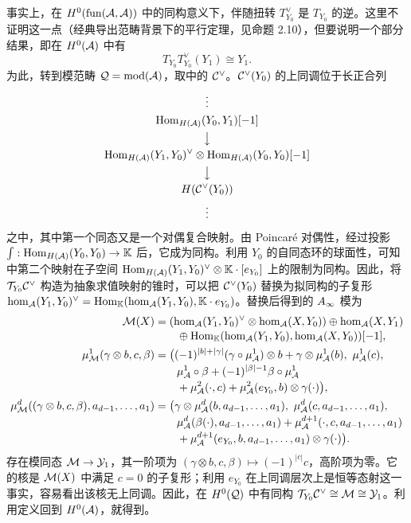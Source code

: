 \begin{note}\label{st:5.12}
事实上，在 $H^0(\operatorname{fun}(\mathcal A,\mathcal A))$ 中的同构意义下，伴随扭转 $T_{Y_0}^{\vee}$ 是 $T_{Y_0}$ 的逆。这里不证明这一点（经典导出范畴背景下的平行定理，见命题 2.10），但要说明一个部分结果，即在 $H^0(\mathcal A)$ 中有
\begin{equation}\label{eq:5.21}
T_{Y_0}T_{Y_0}^{\vee}(Y_1)\cong Y_1.
\end{equation}
为此，转到模范畴 $\mathcal Q=\operatorname{mod}(\mathcal A)$，取中的 $\mathcal C^{\vee}$。$\mathcal C^{\vee}(Y_0)$ 的上同调位于长正合列
\begin{equation}\label{eq:5.22}
\begin{gathered}
\vdots\\
\operatorname{Hom}_{H(\mathcal A)}(Y_0,Y_1)[-1]\\
\big\downarrow\\
\operatorname{Hom}_{H(\mathcal A)}(Y_1,Y_0)^{\vee}\otimes\operatorname{Hom}_{H(\mathcal A)}(Y_0,Y_0)[-1]\\
\big\downarrow\\
H(\mathcal C^{\vee}(Y_0))\\
\vdots
\end{gathered}
\end{equation}
之中，其中第一个同态又是一个对偶复合映射。由 Poincaré 对偶性，经过投影 $\int:\operatorname{Hom}_{H(\mathcal A)}(Y_0,Y_0)\to\mathbb K$ 后，它成为同构。利用
$Y_0$ 的自同态环的球面性，可知中第二个映射在子空间 $\operatorname{Hom}_{H(\mathcal A)}(Y_1,Y_0)^{\vee}\otimes\mathbb K\cdot[e_{Y_0}]$ 上的限制为同构。因此，将 $\mathcal T_{Y_0}\mathcal C^{\vee}$ 构造为抽象求值映射的锥时，可以把 $\mathcal C^{\vee}(Y_0)$ 替换为拟同构的子复形 $\hom_{\mathcal A}(Y_1,Y_0)^{\vee}=\operatorname{Hom}_{\mathbb K}(\hom_{\mathcal A}(Y_1,Y_0),\mathbb K\cdot e_{Y_0})$。替换后得到的 $A_\infty$ 模为
\[
\begin{aligned}
\M(X)&=(\hom_{\A}(Y_1,Y_0)^{\vee}\otimes\hom_{\A}(X,Y_0))\oplus\hom_{\A}(X,Y_1)\\[-2pt]
&\qquad\oplus\Hom_{\K}(\hom_{\A}(Y_1,Y_0),\hom_{\A}(X,Y_0))[-1],\\
\mu^1_{\M}(\gamma\otimes b,c,\beta)
&=\bigl((-1)^{|b|+|\gamma|}(\gamma\circ\mu^1_{\A})\otimes b+\gamma\otimes\mu^1_{\A}(b),\ \mu^1_{\A}(c),\\[-2pt]
&\qquad\mu^1_{\A}\circ\beta+(-1)^{|\beta|-1}\beta\circ\mu^1_{\A}\\[-2pt]
&\qquad+\mu^2_{\A}(\cdot,c)+\mu^2_{\A}(e_{Y_0},b)\otimes\gamma(\cdot)\bigr),\\
\mu^d_{\M}((\gamma\otimes b,c,\beta),a_{d-1},\ldots,a_1)
&=\bigl(\gamma\otimes\mu^d_{\A}(b,a_{d-1},\ldots,a_1),\ \mu^d_{\A}(c,a_{d-1},\ldots,a_1),\\[-2pt]
&\qquad\mu^d_{\A}(\beta(\cdot),a_{d-1},\ldots,a_1)+\mu^{d+1}_{\A}(\cdot,c,a_{d-1},\ldots,a_1)\\[-2pt]
&\qquad+\mu^{d+1}_{\A}(e_{Y_0},b,a_{d-1},\ldots,a_1)\otimes\gamma(\cdot)\bigr).
\end{aligned}
\]
存在模同态 $\mathcal M\to\mathcal Y_1$，其一阶项为 $(\gamma\otimes b,c,\beta)\mapsto(-1)^{|c|}c$，高阶项为零。它的核是 $\mathcal M(X)$ 中满足 $c=0$ 的子复形；利用 $e_{Y_0}$ 在上同调层次上是恒等态射这一事实，容易看出该核无上同调。因此，在 $H^0(\mathcal Q)$ 中有同构 $\mathcal T_{Y_0}\mathcal C^{\vee}\cong\mathcal M\cong\mathcal Y_1$。利用定义回到 $H^0(\mathcal A)$，就得到。
\end{note}
